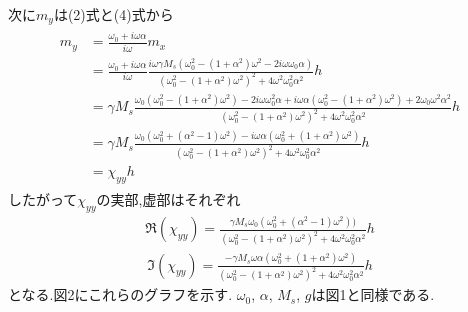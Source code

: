 \documentclass[uplatex,a4j,11pt,dvipdfmx]{jsarticle}
\begin{document}
次に$m_y$は(2)式と(4)式から
\begin{align}
  \begin{split}
    m_y&=\frac{\omega_0+i\omega\alpha}{i\omega}m_x\\
    &=\frac{\omega_0+i\omega\alpha}{i\omega}
    \frac{i\omega\gamma M_s\left(\omega_0^2-(1+\alpha^2)\omega^2-2i\omega\omega_0\alpha\right)}
    {\left(\omega_0^2-(1+\alpha^2)\omega^2\right)^2+4\omega^2\omega_0^2\alpha^2}h\\
    &=\gamma M_s\frac{
      \omega_0\left(\omega_0^2-(1+\alpha^2)\omega^2\right)-2i\omega\omega_0^2\alpha+
      i\omega\alpha\left(\omega_0^2-(1+\alpha^2)\omega^2\right)+2\omega_0\omega^2\alpha^2
    }{\left(\omega_0^2-(1+\alpha^2)\omega^2\right)^2+4\omega^2\omega_0^2\alpha^2}h\\
    &=\gamma M_s\frac{
      \omega_0\left(\omega_0^2+(\alpha^2-1)\omega^2\right)-i\omega\alpha(\omega_0^2+(1+\alpha^2)\omega^2)
    }{\left(\omega_0^2-(1+\alpha^2)\omega^2\right)^2+4\omega^2\omega_0^2\alpha^2}h\\
    &=\chi_{yy}h
  \end{split}
\end{align}
したがって$\chi_{yy}$の実部,虚部はそれぞれ
\begin{align}
  \Re(\chi_{yy})=\frac{
    \gamma M_s\omega_0\left(\omega_0^2+(\alpha^2-1)\omega^2\right))
  }{\left(\omega_0^2-(1+\alpha^2)\omega^2\right)^2+4\omega^2\omega_0^2\alpha^2}h
\end{align}
\begin{align}
  \Im(\chi_{yy})=\frac{
    -\gamma M_s \omega\alpha(\omega_0^2+(1+\alpha^2)\omega^2)
  }{\left(\omega_0^2-(1+\alpha^2)\omega^2\right)^2+4\omega^2\omega_0^2\alpha^2}h
\end{align}
となる.図2にこれらのグラフを示す.
$\omega_0$, $\alpha$, $M_s$, $g$は図1と同様である.
\end{document}
